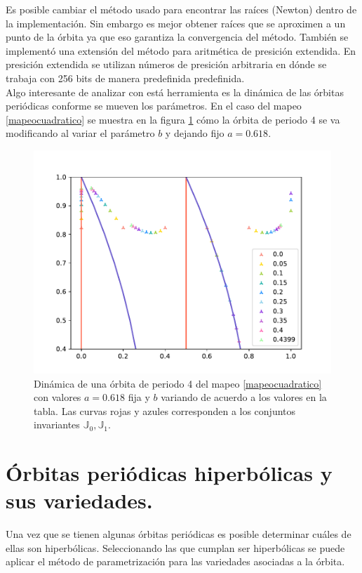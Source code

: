 Es posible cambiar el m\'etodo usado para encontrar las ra\'ices (Newton) dentro de la implementaci\'on. Sin embargo es mejor obtener ra\'ices que se aproximen a un punto de la \'orbita  ya que eso garantiza la convergencia del m\'etodo. Tambi\'en se implement\'o una extensi\'on del m\'etodo para aritm\'etica de presici\'on extendida. En presici\'on extendida se utilizan n\'umeros de presici\'on arbitraria en d\'onde se trabaja con 256 bits de manera predefinida predefinida. \\

Algo interesante de analizar con est\'a herramienta es la din\'amica de las \'orbitas peri\'odicas conforme se mueven los par\'ametros. En el caso del mapeo \eqref{mapeocuadratico} se muestra en la figura  \ref{grafmapeocuadraper4variable} c\'omo la \'orbita de periodo 4 se va modificando al variar el par\'ametro $b$ y dejando fijo $a=0.618$.

\begin{figure}[H]
	\centering
	\includegraphics[scale=0.7]{MapeoCuadraP5b}
	\caption{Din\'amica de una \'orbita de periodo 4 del mapeo \eqref{mapeocuadratico} con valores $a=0.618$ fija y $b$ variando de acuerdo a los valores en la tabla. Las curvas rojas y azules corresponden a los conjuntos invariantes $\mathbb{J}_{0}, \mathbb{J}_{1}$. }
	\label{grafmapeocuadraper4variable}
\end{figure}

\section{\'Orbitas peri\'odicas hiperb\'olicas y sus variedades.}
Una vez que se tienen algunas \'orbitas peri\'odicas es posible determinar cu\'ales de ellas son hiperb\'olicas. Seleccionando las que cumplan ser hiperb\'olicas se puede aplicar el m\'etodo de parametrizaci\'on para las variedades asociadas a la \'orbita. \\

